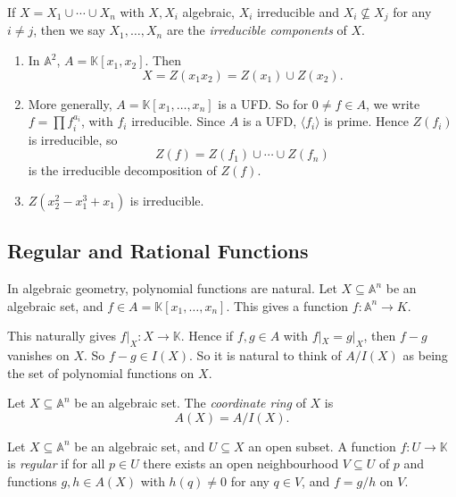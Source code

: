 \documentclass[12pt]{article}
\begin{document}
\begin{definition}
	If $X = X_1 \cup \cdots \cup X_n$ with $X, X_i$ algebraic, $X_i$ irreducible and $X_i \not \subseteq X_j$ for any $i \neq j$, then we say $X_1, \ldots, X_n$ are the \emph{irreducible components} of $X$.
\end{definition}

\begin{exbox}
	\begin{enumerate}
		\item In $\mathbb{A}^2$, $A = \mathbb{K}[x_1, x_2]$. Then
			\[
			X = Z(x_1 x_2) = Z(x_1) \cup Z(x_2).
			\]
		\item More generally, $A = \mathbb{K}[x_1, \ldots, x_n]$ is a UFD. So for $0 \neq f \in A$, we write $f = \prod f_i^{a_i}$, with $f_i$ irreducible. Since $A$ is a UFD, $\langle f_i \rangle$ is prime. Hence $Z(f_i)$ is irreducible, so
			\[
			Z(f) = Z(f_1) \cup \cdots \cup Z(f_n)
			\]
			is the irreducible decomposition of $Z(f)$.
		\item $Z(x_2^2 - x_1^3 + x_1)$ is irreducible.
	\end{enumerate}
\end{exbox}

\subsection{Regular and Rational Functions}
\label{sub:reg_rat_fs}

In algebraic geometry, polynomial functions are natural. Let $X \subseteq \mathbb{A}^n$ be an algebraic set, and $f \in A = \mathbb{K}[x_1, \ldots, x_n]$. This gives a function $f : \mathbb{A}^n \to K$.

This naturally gives $f|_X : X \to \mathbb{K}$. Hence if $f, g \in A$ with $f|_X = g|_X$, then $f - g$ vanishes on $X$. So $f - g \in I(X)$. So it is natural to think of $A/I(X)$ as being the set of polynomial functions on $X$.

\begin{definition}
	Let $X \subseteq \mathbb{A}^n$ be an algebraic set. The \emph{coordinate ring} of $X$ is
	\[
	A(X) = A/I(X).
	\]
\end{definition}

\begin{definition}
	Let $X \subseteq \mathbb{A}^n$ be an algebraic set, and $U \subseteq X$ an open subset. A function $f : U \to \mathbb{K}$ is \emph{regular} if for all $p \in U$ there exists an open neighbourhood $V \subseteq U$ of $p$ and functions $g, h \in A(X)$ with $h(q) \neq 0$ for any $q \in V$, and $f = g/h$ on $V$.
\end{definition}
\end{document}
